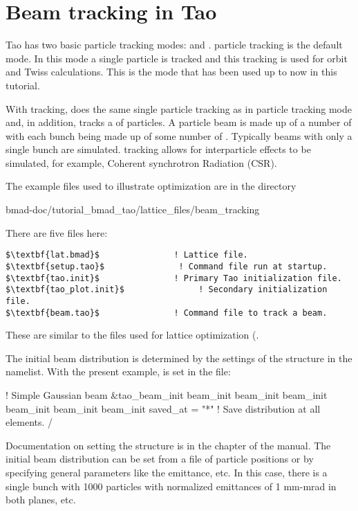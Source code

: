 \documentclass{hitec}     %
\newcommand{\Section}[1]{\section{#1}\vspace*{-1ex}}
\begin{document}
{\begin{enumerate}[label=\thesection.\arabic{enumi}]
\end{enumerate}

\newpage

\Section{Beam tracking in Tao}
\label{s:beam.tracking}

Tao has two basic particle tracking modes:  and .  particle tracking
is the default mode. In this mode a single particle is tracked and this tracking is used for orbit
and Twiss calculations. This is the mode that has been used up to now in this tutorial.

With  tracking, \tao does the same single particle tracking as in  particle
tracking mode and, in addition, \tao tracks a  of particles. A particle beam is made up of
a number of  with each bunch being made up of some number of . Typically
beams with only a single bunch are simulated.  tracking allows for interparticle effects to
be simulated, for example, Coherent synchrotron Radiation (CSR). 

The example files used to illustrate optimization are in the directory 
\begin{code}
bmad-doc/tutorial_bmad_tao/lattice_files/beam_tracking
\end{code}
There are five files here:
\begin{lstlisting}[mathescape]
$\textbf{lat.bmad}$               ! Lattice file.
$\textbf{setup.tao}$               ! Command file run at startup.
$\textbf{tao.init}$               ! Primary Tao initialization file.
$\textbf{tao_plot.init}$               ! Secondary initialization file.
$\textbf{beam.tao}$               ! Command file to track a beam.
\end{lstlisting}
These are similar to the files used for lattice optimization (.

The initial beam distribution is determined by the settings of the  
structure in the  namelist. With the present example,  is 
set in the  file:
\begin{code}
! Simple Gaussian beam 
&tao_beam_init
  beam_init%
  beam_init%
  beam_init%
  beam_init%
  beam_init%
  beam_init%
  saved_at =  "*"                 ! Save distribution at all elements. 
/
\end{code}
Documentation on setting the  structure is in the  
chapter of the \bmad manual. The initial beam distribution can be set from a file of
particle positions or by specifying general parameters like the emittance, etc. In this case,
there is a single bunch with 1000 particles with normalized emittances of 1 mm-mrad in both
planes, etc. 

}
\end{document}
